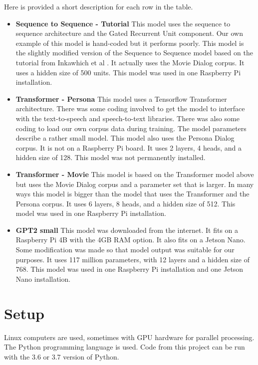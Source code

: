 Here is provided a short description for each row in the table.

\begin{itemize}
	\item \textbf{Sequence to Sequence - Tutorial} This model uses the sequence to sequence architecture and the Gated Recurrent Unit component. Our own example of this model is hand-coded but it performs poorly. This model is the slightly modified version of the Sequence to Sequence model based on the tutorial from Inkawhich et al \cite{2018Inkawhich}. It actually uses the Movie Dialog corpus. It uses a hidden size of 500 units. This model was used in one Raspberry Pi installation.
	
	\item \textbf{Transformer - Persona} This model uses a Tensorflow Transformer architecture. There was some coding involved to get the model to interface with the text-to-speech and speech-to-text libraries. There was also some coding to load our own corpus data during training. The model parameters describe a rather small model. This model also uses the Persona Dialog corpus. It is not on a Raspberry Pi board. It uses 2 layers, 4  heads, and a hidden size of 128. This model was not permanently installed.
	
	\item \textbf{Transformer - Movie} This model is based on the Transformer model above but uses the Movie Dialog corpus and a parameter set that is larger. In many ways this model is bigger than the model that uses the Transformer and the Persona corpus. It uses 6 layers, 8 heads, and a hidden size of 512. This model was used in one Raspberry Pi installation.
	
	\item \textbf{GPT2 small} This model was downloaded from the internet. It fits on a Raspberry Pi 4B with the 4GB RAM option. It also fits on a Jetson Nano. Some modification was made so that model output was suitable for our purposes. It uses 117 million parameters, with 12 layers and a hidden size of 768. This model was used in one Raspberry Pi installation and one Jetson Nano installation.
\end{itemize}

\section{Setup}

Linux computers are used, sometimes with \ac{GPU} hardware for parallel processing. The Python programming language is used. Code from this project can be run with the 3.6 or 3.7 version of Python.

